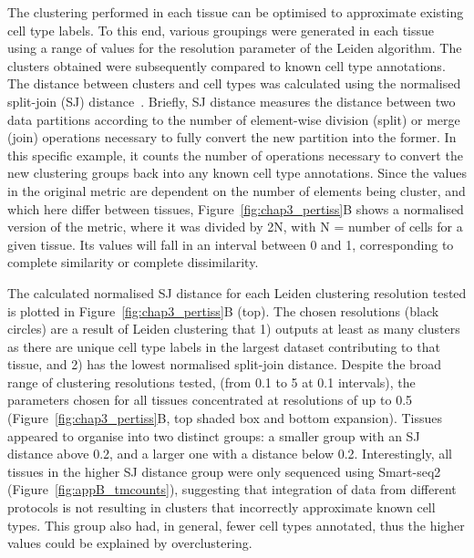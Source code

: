The clustering performed in each tissue can be optimised to approximate existing cell type labels. To this end, various groupings were generated in each tissue using a range of values for the resolution parameter of the Leiden algorithm. The clusters obtained were subsequently compared to known cell type annotations. The distance between clusters and cell types was calculated using the normalised split-join (SJ) distance~\citep{dongen_performance_2000}. Briefly, SJ distance measures the distance between two data partitions according to the number of element-wise division (split) or merge (join) operations necessary to fully convert the new partition into the former. In this specific example, it counts the number of operations necessary to convert the new clustering groups back into any known cell type annotations. Since the values in the original metric are dependent on the number of elements being cluster, and which here differ between tissues, Figure~\ref{fig:chap3_pertiss}B shows a normalised version of the metric, where it was divided by 2N, with N = number of cells for a given tissue. Its values will fall in an interval between 0 and 1, corresponding to complete similarity or complete dissimilarity. 

The calculated normalised SJ distance for each Leiden clustering resolution tested is plotted in Figure~\ref{fig:chap3_pertiss}B (top). The chosen resolutions (black circles) are a result of Leiden clustering that 1) outputs at least as many clusters as there are unique cell type labels in the largest dataset contributing to that tissue, and 2) has the lowest normalised split-join distance. Despite the broad range of clustering resolutions tested, (from 0.1 to 5 at 0.1 intervals), the parameters chosen for all tissues concentrated at resolutions of up to 0.5 (Figure~\ref{fig:chap3_pertiss}B, top shaded box and bottom expansion). Tissues appeared to organise into two distinct groups: a smaller group with an SJ distance above 0.2, and a larger one with a distance below 0.2. Interestingly, all tissues in the higher SJ distance group were only sequenced using Smart-seq2 (Figure~\ref{fig:appB_tmcounts}), suggesting that integration of data from different protocols is not resulting in clusters that incorrectly approximate known cell types. This group also had, in general, fewer cell types annotated, thus the higher values could be explained by overclustering.

